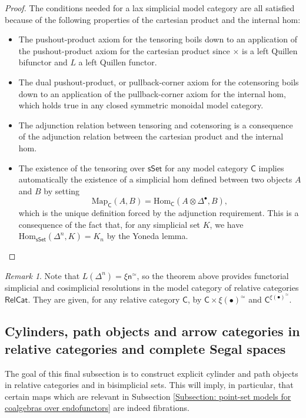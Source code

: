 \documentclass{proc-l}
\theoremstyle{plain}
\theoremstyle{definition}
\theoremstyle{remark}
\newtheorem{remark}[{theorem}]{Remark}
\begin{document}
\begin{proof}
The conditions needed for a lax simplicial model category are all satisfied because of the following properties of the cartesian product and the internal hom:
\begin{itemize}
\item The pushout-product axiom for the tensoring boils down to an application of the pushout-product axiom for the cartesian product since $\times$ is a left Quillen bifunctor and $L$ a left Quillen functor.

\item The dual pushout-product, or pullback-corner axiom for the cotensoring boils down to an application of the pullback-corner axiom for the internal hom, which holds true in any closed symmetric monoidal model category.

\item The adjunction relation between tensoring and cotensoring is a consequence of the adjunction relation between the cartesian product and the internal hom.

\item The existence of the tensoring over $\mathsf{sSet}$ for any model category $\mathsf{C}$ implies automatically the existence of a simplicial hom defined between two objects $A$ and $B$ by setting
\[
\mathrm{Map}_{\mathsf{C}}(A,B)= \mathrm{Hom}_{\mathsf{C}}(A \otimes \Delta^{\bullet},B),
\]
which is the unique definition forced by the adjunction requirement. This is a consequence of the fact that, for any simplicial set $K$, we have $\mathrm{Hom}_{\mathsf{sSet}}(\Delta^n,K)= K_n$ by the Yoneda lemma.
\end{itemize}
\end{proof}
\begin{remark}%
\label{Remark:A.11}Note that $L(\Delta^n)=\xi\mathsf{n}^{\simeq}$, so the theorem above provides functorial simplicial and cosimplicial resolutions in the model category of relative categories $\mathsf{RelCat}$. They are given, for any relative category $\mathsf{C}$, by $\mathsf{C} \times \xi (\bullet)^{\simeq}$ and $\mathsf{C}^{\xi(\bullet)^{\simeq}}$.
\end{remark}

\subsection{Cylinders, path objects and arrow categories in relative categories and complete Segal spaces}%
\label{Section:A.4}
The goal of this final subsection is to construct explicit cylinder and path objects in relative categories and in bisimplicial sets. This will imply, in particular, that certain maps which are relevant in Subsection \ref{Subsection: point-set models for coalgebras over endofunctors} are indeed fibrations.
\end{document}
